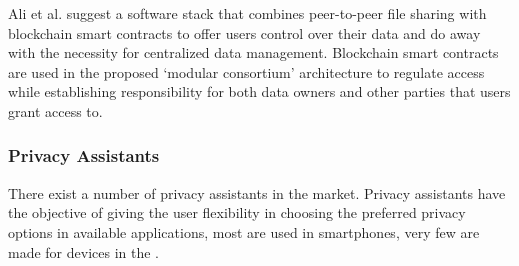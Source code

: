 Ali et al. \cite{AliIoT} suggest a software stack that combines peer-to-peer
file sharing with blockchain smart contracts to offer \hyperlink{\acronym}{\acronym} users control
over their data and do away with the necessity for centralized \hyperlink{\acronym}{\acronym} data
management. Blockchain smart contracts are used in the proposed `modular
consortium' architecture to regulate access while establishing responsibility
for both data owners and other parties that users grant access to.

\subsubsection{Privacy Assistants}\label{subsubsection:privacy_assistants}

There exist a number of privacy assistants in the market. Privacy assistants
have the objective of giving the user flexibility in choosing the preferred
privacy options in available applications, most are used in smartphones,
very few are made for devices in the \hyperlink{\acronym}{\acronym}.

